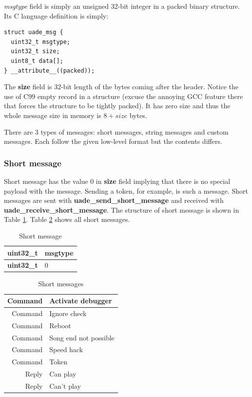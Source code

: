 \documentclass{article}
\begin{document}
\emph{msgtype} field is simply an unsigned 32-bit integer in a packed
binary structure. Its C language definition is simply:
\begin{verbatim}
struct uade_msg {
  uint32_t msgtype;
  uint32_t size;
  uint8_t data[];
} __attribute__((packed));
\end{verbatim}

The \textbf{size} field is 32-bit length of the bytes coming after the header.
Notice the use of C99 empty record in a structure (excuse the annoying GCC
feature there that forces the structure to be tightly packed). It has zero
size and thus the whole message size in memory is $8 + size$ bytes.

There are 3 types of messages: short messages, string messages and custom
messages. Each follow the given low-level format but the contents differs.

\subsubsection{Short message}

Short message has the value $0$ in \textbf{size} field implying that there is
no special payload with the message. Sending a token, for example, is such
a message. Short messages are sent with \textbf{uade\_send\_short\_message}
and received with \textbf{uade\_receive\_short\_message}. The structure
of short message is shown in Table \ref{tab:short_message}.
Table \ref{tab:short_messages} shows all short messages.

\begin{table}
\begin{center}
\caption{Short message}
\label{tab:short_message}
\begin{tabular}{|r|l|}
\hline
\textbf{uint32\_t} & msgtype \\
\hline
\textbf{uint32\_t} & 0 \\
\hline
\end{tabular}
\end{center}
\end{table}

\begin{table}
\begin{center}
\caption{Short messages}
\label{tab:short_messages}
\begin{tabular}{|r|l|}
\hline
Command & Activate debugger\\
\hline
Command & Ignore check\\
\hline
Command & Reboot \\
\hline
Command & Song end not possible \\
\hline
Command & Speed hack \\
\hline
Command & Token \\
\hline
Reply & Can play\\
\hline
Reply & Can't play\\
\hline
\end{tabular}
\end{center}
\end{table}
\end{document}
